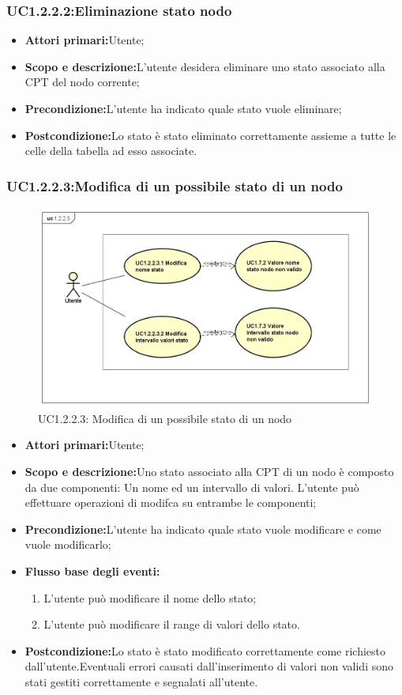 \subsubsection{UC1.2.2.2:Eliminazione stato nodo}
\begin{itemize}
	\item{\textbf{Attori primari:}Utente;}
	\item{\textbf{Scopo e descrizione:}L'utente desidera eliminare uno stato associato alla CPT del nodo corrente;}
	\item{\textbf{Precondizione:}L'utente ha indicato quale stato vuole eliminare;}
	\item{\textbf{Postcondizione:}Lo stato è stato eliminato correttamente assieme a tutte le celle della tabella ad esso associate.}
\end{itemize}
\subsubsection{UC1.2.2.3:Modifica di un possibile stato di un nodo}
\begin{figure} [H]
	\centering
	\includegraphics[scale=0.45]{Img/UC1-2-2-3}
	\caption{UC1.2.2.3: Modifica di un possibile stato di un nodo}\label{}
\end{figure}
\begin{itemize}
	\item{\textbf{Attori primari:}Utente;}
	\item{\textbf{Scopo e descrizione:}Uno stato associato alla CPT di un nodo è composto da due componenti: Un nome ed un intervallo di valori. L'utente può effettuare operazioni di modifca su entrambe le componenti;}
	\item{\textbf{Precondizione:}L'utente ha indicato quale stato vuole modificare e come vuole modificarlo;}
	\item{\textbf{Flusso base degli eventi:}
		\begin{enumerate}
			\item{L'utente può modificare il nome dello stato;}
			\item{L'utente può modificare il range di valori dello stato.}
		\end{enumerate}			
	}
	\item{\textbf{Postcondizione:}Lo stato è stato modificato correttamente come richiesto dall'utente.Eventuali errori causati dall'inserimento di valori non validi sono stati gestiti correttamente e segnalati all'utente.}
\end{itemize}
